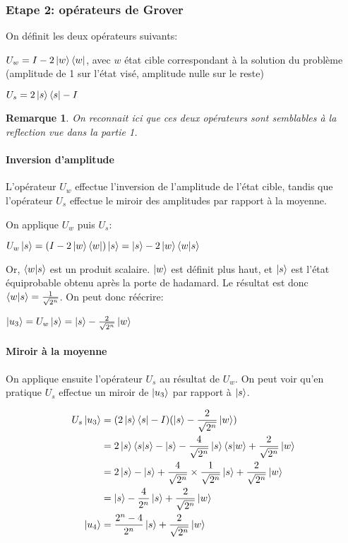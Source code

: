 \documentclass[a4paper]{article}
\newtheorem{rem}{Remarque}
\begin{document}
\subsubsection*{Etape 2: opérateurs de Grover}

On définit les deux opérateurs suivants:

$U_w = I - 2\ket{w}\bra{w}$, avec $w$ état cible correspondant à la solution du problème (amplitude de 1 sur l'état visé, amplitude nulle sur le reste)

$U_s = 2\ket{s}\bra{s} - I$

\begin{rem}
  On reconnait ici que ces deux opérateurs sont semblables à la reflection vue dans la partie 1.
\end{rem}

\paragraph*{Inversion d'amplitude}

L'opérateur $U_w$ effectue l'inversion de l'amplitude de l'état cible, tandis que l'opérateur $U_s$ effectue le miroir des amplitudes par rapport à la moyenne.

On applique $U_w$ puis $U_s$:

$U_w \ket{s} = (I - 2 \ket{w}\bra{w})\ket{s} \nonumber = \ket{s} - 2 \ket{w}\braket{w|s}$

Or, $\braket{w|s}$ est un produit scalaire. $\ket{w}$ est définit plus haut, et $\ket{s}$ est l'état équiprobable obtenu après la porte de hadamard. Le résultat est donc $\braket{w|s} = \frac{1}{\sqrt{2^n}}$. On peut donc réécrire:

$\ket{u_3} = U_w \ket{s} = \ket{s} - \frac{2}{\sqrt{2^n}}\ket{w}$

\paragraph*{Miroir à la moyenne}
On applique ensuite l'opérateur $U_s$ au résultat de $U_w$. On peut voir qu'en pratique $U_s$ effectue un miroir de $\ket{u_3}$ par rapport à $\ket{s}$.

\begin{align}
  U_s\ket{u_3} 
  &= (2\ket{s}\bra{s} - I)(\ket{s} - \frac{2}{\sqrt{2^n}}\ket{w}) \nonumber \\
  &= 2\ket{s}\braket{s|s} - \ket{s} - \frac{4}{\sqrt{2^n}} \ket{s} \braket{s|w} + \frac{2}{\sqrt{2^n}}\ket{w} \nonumber \\
  &= 2\ket{s} - \ket{s} + \frac{4}{\sqrt{2^n}} \times \frac{1}{\sqrt{2^n}} \ket{s} + \frac{2}{\sqrt{2^n}}\ket{w} \nonumber \\
  &= \ket{s} - \frac{4}{2^n} \ket{s} + \frac{2}{\sqrt{2^n}}\ket{w} \nonumber \\
  \ket{u_4}&=\frac{2^n - 4}{2^n}\ket{s} + \frac{2}{\sqrt{2^n}}\ket{w}
\end{align}
\end{document}
